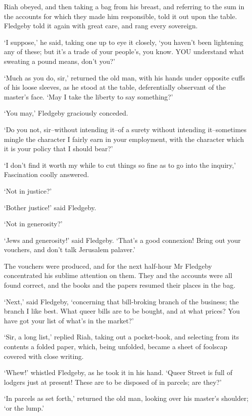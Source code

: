 Riah obeyed, and then taking a bag from his breast, and referring to
the sum in the accounts for which they made him responsible, told it out
upon the table. Fledgeby told it again with great care, and rang every
sovereign.

‘I suppose,’ he said, taking one up to eye it closely, ‘you haven’t been
lightening any of these; but it’s a trade of your people’s, you know.
YOU understand what sweating a pound means, don’t you?’

‘Much as you do, sir,’ returned the old man, with his hands under
opposite cuffs of his loose sleeves, as he stood at the table,
deferentially observant of the master’s face. ‘May I take the liberty to
say something?’

‘You may,’ Fledgeby graciously conceded.

‘Do you not, sir--without intending it--of a surety without intending
it--sometimes mingle the character I fairly earn in your employment,
with the character which it is your policy that I should bear?’

‘I don’t find it worth my while to cut things so fine as to go into the
inquiry,’ Fascination coolly answered.

‘Not in justice?’

‘Bother justice!’ said Fledgeby.

‘Not in generosity?’

‘Jews and generosity!’ said Fledgeby. ‘That’s a good connexion! Bring
out your vouchers, and don’t talk Jerusalem palaver.’

The vouchers were produced, and for the next half-hour Mr Fledgeby
concentrated his sublime attention on them. They and the accounts were
all found correct, and the books and the papers resumed their places in
the bag.

‘Next,’ said Fledgeby, ‘concerning that bill-broking branch of the
business; the branch I like best. What queer bills are to be bought, and
at what prices? You have got your list of what’s in the market?’

‘Sir, a long list,’ replied Riah, taking out a pocket-book, and
selecting from its contents a folded paper, which, being unfolded,
became a sheet of foolscap covered with close writing.

‘Whew!’ whistled Fledgeby, as he took it in his hand. ‘Queer Street is
full of lodgers just at present! These are to be disposed of in parcels;
are they?’

‘In parcels as set forth,’ returned the old man, looking over his
master’s shoulder; ‘or the lump.’

